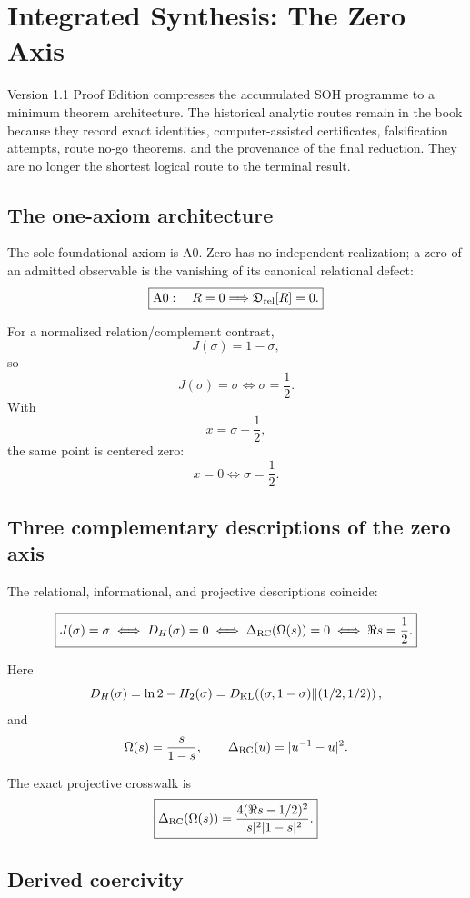 \chapter*{Integrated Synthesis: The Zero Axis}
\label{back:final-synthesis}

Version 1.1 Proof Edition compresses the accumulated SOH programme to a minimum theorem
architecture. The historical analytic routes remain in the book because they
record exact identities, computer-assisted certificates, falsification
attempts, route no-go theorems, and the provenance of the final reduction.
They are no longer the shortest logical route to the terminal result.

\section*{The one-axiom architecture}

The sole foundational axiom is A0. Zero has no independent realization; a
zero of an admitted observable is the vanishing of its canonical relational
defect:
\[
\boxed{
\mathrm{A0}:\quad
R=0\Longrightarrow\mathfrak D_{\rm rel}[R]=0.
}
\]

For a normalized relation/complement contrast,
\[
J(\sigma)=1-\sigma,
\]
so
\[
J(\sigma)=\sigma
\iff
\sigma=\frac12.
\]
With
\[
x=\sigma-\frac12,
\]
the same point is centered zero:
\[
x=0\iff\sigma=\frac12.
\]

\section*{Three complementary descriptions of the zero axis}

The relational, informational, and projective descriptions coincide:

\[
\boxed{
J(\sigma)=\sigma
\iff
D_H(\sigma)=0
\iff
\Delta_{\rm RC}(\Omega(s))=0
\iff
\Re s=\frac12.
}
\]

Here
\[
D_H(\sigma)
=
\ln2-H_2(\sigma)
=
D_{\rm KL}\!\left(
(\sigma,1-\sigma)
\middle\|
(1/2,1/2)
\right),
\]
and
\[
\Omega(s)=\frac{s}{1-s},
\qquad
\Delta_{\rm RC}(u)=|u^{-1}-\bar u|^2.
\]

The exact projective crosswalk is
\[
\boxed{
\Delta_{\rm RC}(\Omega(s))
=
\frac{4(\Re s-1/2)^2}{|s|^2|1-s|^2}.
}
\]

\section*{Derived coercivity}


